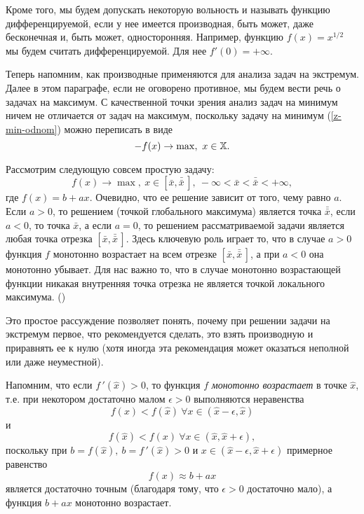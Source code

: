     Кроме
    того, мы будем допускать некоторую вольность и называть функцию
    дифференцируемой, если у нее имеется производная, быть может,
    даже бесконечная и, быть может, односторонняя. Например, функцию
    $f(x)=x^{1/2}$ мы будем считать дифференцируемой. Для нее
    $f'(0)=+\infty$.

    Теперь напомним, как производные применяются для анализа задач
    на экстремум.
    Далее в этом параграфе, если не оговорено противное, мы будем
    вести речь о задачах на максимум. С качественной точки зрения
    анализ задач на минимум ничем не отличается от задач на
    максимум, поскольку задачу на минимум
    (\ref{z-min-odnom}) можно переписать в виде
    \[-f(x)\rightarrow \max, \ x\in\st{X}.\]

    Рассмотрим следующую совсем простую задачу:
\begin{equation}
\label{monot-max}
    f(x)\rightarrow \max, \ x\in[\bar{x},\bar{\bar{x}}\,], \ -\infty<\bar{x}<\bar{\bar{x}}<+\infty,
\end{equation}
    где $f(x)=b+ax$.
    Очевидно, что ее решение зависит от того, чему равно $a$. Если
    $a>0$, то решением (точкой глобального максимума) является точка
    $\bar{\bar{x}}$, если $a<0$, то точка $\bar{x}$, а если $a=0$, то решением
    рассматриваемой задачи является любая точка отрезка $[\bar{x},\bar{\bar{x}}\,]$.
    Здесь ключевую роль играет то, что в случае $a>0$ функция $f$
    монотонно возрастает на всем отрезке $[\bar{x},\bar{\bar{x}}\,]$, а при $a<0$ она
    монотонно убывает. Для нас важно то, что в случае монотонно возрастающей
    функции никакая внутренняя точка отрезка не является точкой
    локального максимума.
    ()

      Это простое рассуждение позволяет понять, почему при решении
    задачи на экстремум первое, что рекомендуется сделать, это взять
    производную и приравнять ее к нулю (хотя иногда эта
    рекомендация может оказаться неполной или даже неуместной).

    Напомним, что если $f\,'(\hat{x})>0$,
    то функция $f$ \emph{монотонно возрастает} в точке $\hat{x}$, т.е. при
    некотором достаточно малом $\epsilon>0$ выполняются неравенства
    \[f(x)<f(\hat{x}) \ \forall x\in(\hat{x}-\epsilon,\hat{x})\]
    и
    \[f(\hat{x})<f(x) \ \forall x\in(\hat{x},\hat{x}+\epsilon),\]
    поскольку при $b=f(\hat{x}), \ b=f\,'(\hat{x})>0$ и
    $x\in(\hat{x}-\epsilon,\hat{x}+\epsilon)$
    примерное  равенство
    \[f(x)\approx b+ax\]
    является достаточно точным (благодаря тому, что $\epsilon>0$ достаточно мало),
    а функция $b+ax$ монотонно возрастает.


